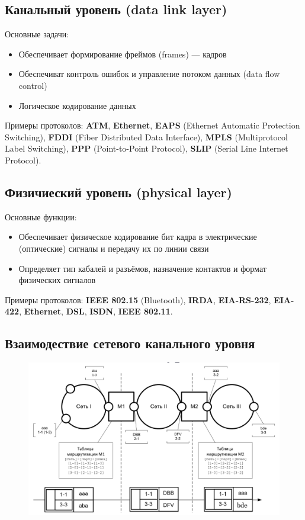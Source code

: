 \documentclass[10pt,a4paper,oneside,titlepage]{report}
\theoremstyle{defenition}
\begin{document}
\subsection{Канальный уровень (data link layer)}

Основные задачи:
\begin{itemize}
	\item Обеспечивает формирование фреймов (frames) --- кадров
	\item Обеспечиват контроль ошибок и управление потоком данных (data flow control)
	\item Логическое кодирование данных
\end{itemize}

Примеры протоколов: {\bfseries ATM}, {\bfseries Ethernet}, {\bfseries EAPS} (Ethernet Automatic Protection Switching), {\bfseries FDDI} (Fiber Distributed Data Interface), {\bfseries MPLS} (Multiprotocol Label Switching), {\bfseries PPP} (Point-to-Point Protocol), {\bfseries SLIP} (Serial Line Internet Protocol).

\subsection{Физичиеский уровень (physical layer)}

Основные функции:
\begin{itemize}
	\item Обеспечивает физическое кодирование бит кадра в электрические (оптические) сигналы и передачу их по линии связи
	\item Определяет тип кабалей и разъёмов, назначение контактов и формат физических сигналов
\end{itemize}

Примеры протоколов: {\bfseries IEEE 802.15} (Bluetooth), {\bfseries IRDA}, {\bfseries EIA-RS-232}, {\bfseries EIA-422}, {\bfseries Ethernet}, {\bfseries DSL}, {\bfseries ISDN}, {\bfseries IEEE 802.11}.

\subsection{Взаимодествие сетевого канального уровня}

\begin{figure}[h!]
	\centering
	\includegraphics[width=0.4\linewidth]{pictures/NetToLink}
	\caption[Взаимодействие сетевого и канального уровня]{}
	\label{fig:nettolink}
\end{figure}
\end{document}
